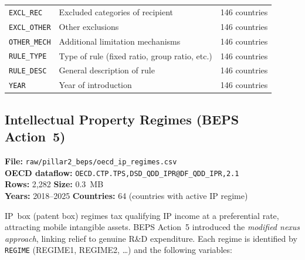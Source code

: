 \documentclass[11pt,a4paper]{article}
\begin{document}
\begin{longtable}{L{2.8cm} L{6.5cm} C{2.5cm}}
    \texttt{EXCL\_REC}   & Excluded categories of recipient & 146 countries \\
    \texttt{EXCL\_OTHER} & Other exclusions & 146 countries \\
    \texttt{OTHER\_MECH} & Additional limitation mechanisms & 146 countries \\
    \texttt{RULE\_TYPE}  & Type of rule (fixed ratio, group ratio, etc.) & 146 countries \\
    \texttt{RULE\_DESC}  & General description of rule & 146 countries \\
    \texttt{YEAR}        & Year of introduction & 146 countries \\
\end{longtable}

\subsection{Intellectual Property Regimes (BEPS Action~5)}
\label{subsec:beps_ip}

\textbf{File:} \texttt{raw/pillar2\_beps/oecd\_ip\_regimes.csv}\\
\textbf{OECD dataflow:} \texttt{OECD.CTP.TPS,DSD\_QDD\_IPR@DF\_QDD\_IPR,2.1}\\
\textbf{Rows:} 2{,}282 \quad \textbf{Size:} 0.3~MB\\
\textbf{Years:} 2018--2025 \quad \textbf{Countries:} 64 (countries with active IP regime)

IP~box (patent box) regimes tax qualifying IP income at a preferential rate,
attracting mobile intangible assets.  BEPS Action~5 introduced the
\emph{modified nexus approach}, linking relief to genuine R\&D expenditure.
Each regime is identified by \texttt{REGIME} (REGIME1, REGIME2, \ldots) and
the following variables:
\end{document}
